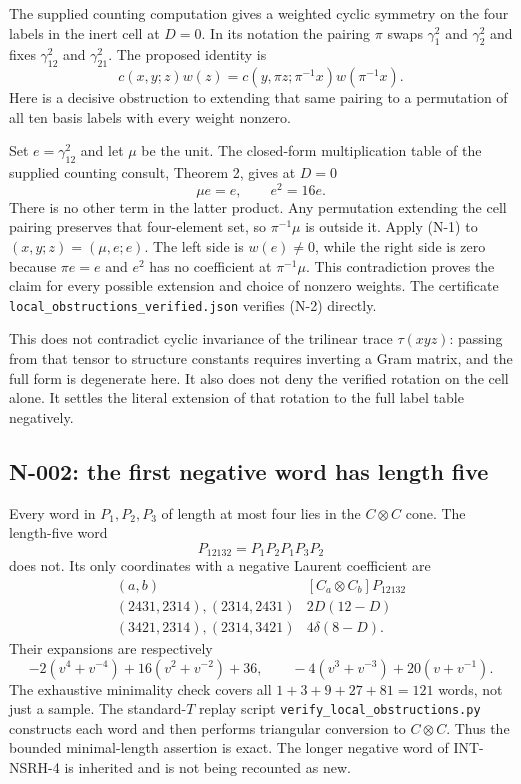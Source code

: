 The supplied counting computation gives a weighted cyclic symmetry on
the four labels in the inert cell at $D=0$.  In its notation the pairing
$\pi$ swaps $\gamma^2_1$ and $\gamma^2_2$ and fixes
$\gamma^2_{12}$ and $\gamma^2_{21}$.  The proposed identity is
\[
 c(x,y;z)w(z)=c(y,\pi z;\pi^{-1}x)w(\pi^{-1}x).
 \tag{N-1}
\]
Here is a decisive obstruction to extending that same pairing to a
permutation of all ten basis labels with every weight nonzero.

Set $e=\gamma^2_{12}$ and let $\mu$ be the unit.  The closed-form
multiplication table of the supplied counting consult, Theorem 2, gives
at $D=0$
\[
                 \mu e=e,\qquad e^2=16e.
 \tag{N-2}
\]
There is no other term in the latter product.  Any permutation extending
the cell pairing preserves that four-element set, so
$\pi^{-1}\mu$ is outside it.  Apply (N-1) to $(x,y;z)=(\mu,e;e)$.
The left side is $w(e)\ne0$, while the right side is zero because
$\pi e=e$ and $e^2$ has no coefficient at $\pi^{-1}\mu$.
This contradiction proves the claim for every possible extension and
choice of nonzero weights.  The certificate
\nolinkurl{local_obstructions_verified.json} verifies (N-2) directly.

This does not contradict cyclic invariance of the trilinear trace
$\tau(xyz)$: passing from that tensor to structure constants requires
inverting a Gram matrix, and the full form is degenerate here.  It also
does not deny the verified rotation on the cell alone.  It settles the
literal extension of that rotation to the full label table negatively.

\subsection{N-002: the first negative word has length five}

Every word in $P_1,P_2,P_3$ of length at most four lies in the
$C\otimes C$ cone.  The length-five word
\[
                         P_{12132}=P_1P_2P_1P_3P_2
\]
does not.  Its only coordinates with a negative Laurent coefficient are
\[
\begin{array}{c|c}
(a,b)&[C_a\otimes C_b]P_{12132}\\\hline
(2431,2314),(2314,2431)&2D(12-D)\\
(3421,2314),(2314,3421)&4\delta(8-D).
\end{array}
\tag{N-3}
\]
Their expansions are respectively
\[
 -2(v^4+v^{-4})+16(v^2+v^{-2})+36,
 \qquad -4(v^3+v^{-3})+20(v+v^{-1}).
\]
The exhaustive minimality check covers all $1+3+9+27+81=121$ words,
not just a sample.  The standard-$T$ replay script
\nolinkurl{verify_local_obstructions.py} constructs each word and then
performs triangular conversion to $C\otimes C$.  Thus the bounded
minimal-length assertion is exact.  The longer negative word of
INT-NSRH-4 is inherited and is not being recounted as new.

